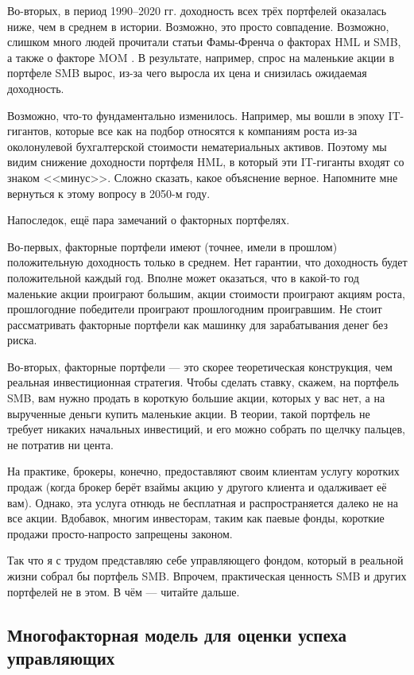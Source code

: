 Во-вторых, в период 1990--2020 гг. доходность всех трёх портфелей оказалась 
ниже, чем в среднем в истории. Возможно, это просто совпадение. Возможно, 
слишком много людей прочитали статьи Фамы-Френча о факторах HML и SMB, а также 
 о факторе MOM \cite{carhart1997persistence}. 
В результате, например, спрос на маленькие акции в портфеле SMB вырос, из-за 
чего выросла их цена и снизилась ожидаемая доходность.

Возможно, что-то фундаментально изменилось. Например, мы вошли в эпоху IT-
гигантов, которые все как на подбор относятся к компаниям роста из-за 
околонулевой бухгалтерской стоимости нематериальных активов. Поэтому мы видим 
снижение доходности портфеля HML, в который эти IT-гиганты входят со знаком 
<<минус>>. Сложно сказать, какое объяснение верное. Напомните мне вернуться к 
этому вопросу в 2050-м году.

Напоследок, ещё пара замечаний о факторных портфелях.

Во-первых, факторные портфели имеют (точнее, имели в прошлом) положительную 
доходность только в среднем. Нет гарантии, что доходность будет положительной 
каждый год. Вполне может оказаться, что в какой-то год маленькие акции проиграют 
большим, акции стоимости проиграют акциям роста, прошлогодние победители 
проиграют прошлогодним проигравшим. Не стоит рассматривать факторные портфели 
как машинку для зарабатывания денег без риска.

Во-вторых, факторные портфели --- это скорее теоретическая конструкция, чем 
реальная инвестиционная стратегия. Чтобы сделать ставку, скажем, на портфель 
SMB, вам нужно продать в короткую большие акции, которых у вас нет, а на 
вырученные деньги купить маленькие акции. В теории, такой портфель не требует 
никаких начальных инвестиций, и его можно собрать по щелчку пальцев, не потратив 
ни цента.

На практике, брокеры, конечно, предоставляют своим клиентам услугу коротких 
продаж (когда брокер берёт взаймы акцию у другого клиента и одалживает её вам). 
Однако, эта услуга отнюдь не бесплатная и распространяется далеко не на все 
акции. Вдобавок, многим инвесторам, таким как паевые фонды, короткие продажи 
просто-напросто запрещены законом.

Так что я с трудом представляю себе управляющего фондом, который в реальной 
жизни собрал бы портфель SMB. Впрочем, практическая ценность SMB и других 
портфелей не в этом. В чём --- читайте дальше.

\subsection{Многофакторная модель для оценки успеха управляющих}

